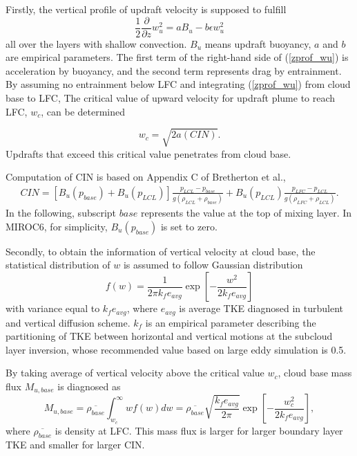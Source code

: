 Firstly, the vertical profile of updraft velocity is supposed to fulfill 
\begin{equation}\label{zprof_wu}
    \frac{1}{2}\frac{\partial}{\partial z}w_u^2=aB_u-b\epsilon w_u^2
\end{equation}
all over the layers with shallow convection. $B_u$ means updraft buoyancy, $a$ and $b$ are empirical parameters. 
The first term of the right-hand side of (\ref{zprof_wu}) is acceleration by buoyancy, and the second term represents drag by entrainment.
By assuming no entrainment below LFC and integrating (\ref{zprof_wu}) from cloud base to LFC, The critical value of upward velocity for updraft plume to reach LFC, $w_c$, can be determined

\begin{equation}\label{wc}
    w_c = \sqrt{2a(CIN)}.
\end{equation}
Updrafts that exceed this critical value penetrates from cloud base.

Computation of CIN is based on Appendix C of Bretherton et al., 
\begin{align}\label{def_CIN}
    CIN = [B_u(p_{base}) + B_u(p_{LCL})]\frac{p_{LCL}-p_{base}}{g(\rho_{LCL}+\rho_{base})} + B_u(p_{LCL})\frac{p_{LFC}-p_{LCL}}{g(\rho_{LFC}+\rho_{LCL})}.
\end{align}
In the following, subscript $\mathit{base}$ represents the value at the top of mixing layer. 
In MIROC6, for simplicity, $B_u(p_{base})$ is set to zero.

Secondly, to obtain the information of vertical velocity at cloud base, the statistical distribution of $w$ is assumed to follow Gaussian distribution
\begin{equation}\label{distr_w}
    f(w) = \frac{1}{2\pi k_f e_{avg}}\exp\left[ -\frac{w^2}{2k_fe_{avg}}\right]
\end{equation}
with variance equal to $k_f e_{avg}$, where $e_{avg}$ is average TKE diagnosed in turbulent and vertical diffusion scheme.
$k_f$ is an empirical parameter describing the partitioning of TKE between horizontal and vertical motions at the subcloud layer inversion, whose recommended value based on large eddy simulation is 0.5.

By taking average of vertical velocity above the critical value $w_c$, cloud base mass flux $M_{u,base}$ is diagnosed as
\begin{equation}\label{Mubase}
    M_{u,base}=\overline{\rho_{base}}\int_{w_c}^{\infty}wf(w)dw =\overline{\rho_{base}}\sqrt{\frac{k_f e_{avg}}{2\pi}}\exp\left[-\frac{w_c^2}{2k_fe_{avg}}\right],
\end{equation}
where $\overline{\rho_{base}}$ is density at LFC.
This mass flux is larger for larger boundary layer TKE and smaller for larger CIN.

